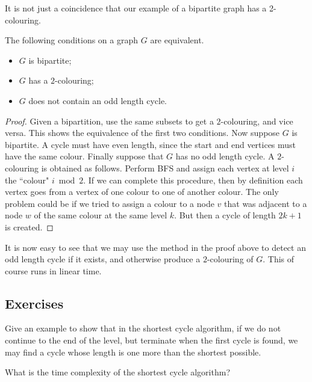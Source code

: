 It is not just a coincidence that our example of a bipartite graph
has a 2-colouring.

\begin{Theorem} 
The following conditions on a graph $G$ are equivalent.
\begin{itemize}
\item
$G$ is bipartite;
\item
$G$ has a $2$-colouring;
\item
$G$ does not contain an odd length cycle.
\end{itemize}
\end{Theorem}

\begin{proof} 
Given a bipartition, use the same subsets to get a $2$-colouring, and
vice versa. This shows the equivalence of the first two conditions. Now
suppose $G$ is bipartite.  A cycle must have even length, since the start
and end vertices must have the same colour. Finally suppose that $G$
has no odd length cycle. A $2$-colouring is obtained as follows. Perform
BFS and assign each vertex at level $i$ the ``colour" $i \bmod 2$. If we
can complete this procedure, then by definition each vertex goes from
a vertex of one colour to one of another colour. The only problem could
be if we tried to assign a colour to a node $v$ that was adjacent to a
node $w$ of the same colour at the same level $k$. But then a cycle of
length $2k+1$ is created.
\end{proof}

It is now easy to see that we may use the method in the proof above
to detect an odd length cycle if it exists, and otherwise produce a
$2$-colouring of $G$. This of course runs in linear time.

\subsection*{Exercises}

\begin{Exercise}
\label{ex:shortest-cycle-thm}
Give an example to show that in the shortest cycle algorithm, if we
do not continue to the end of the level, but terminate when the first
cycle is found, we may find a cycle whose length is one more than the
shortest possible.
\end{Exercise}

\begin{Exercise}
\label{ex:shortest-cycle-runtime}
What is the time complexity of the shortest cycle algorithm?
\end{Exercise}

